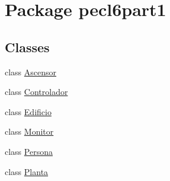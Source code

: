 \hypertarget{namespacepecl6part1}{}\section{Package pecl6part1}
\label{namespacepecl6part1}
\subsection*{Classes}
\begin{DoxyCompactItemize}
\item 
class \mbox{\hyperlink{classpecl6part1_1_1_ascensor}{Ascensor}}
\item 
class \mbox{\hyperlink{classpecl6part1_1_1_controlador}{Controlador}}
\item 
class \mbox{\hyperlink{classpecl6part1_1_1_edificio}{Edificio}}
\item 
class \mbox{\hyperlink{classpecl6part1_1_1_monitor}{Monitor}}
\item 
class \mbox{\hyperlink{classpecl6part1_1_1_persona}{Persona}}
\item 
class \mbox{\hyperlink{classpecl6part1_1_1_planta}{Planta}}
\end{DoxyCompactItemize}
